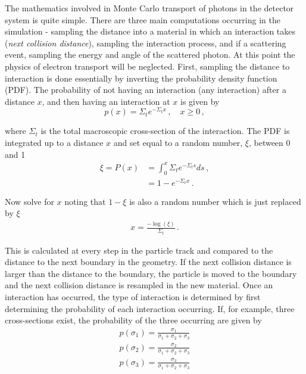 \documentclass[10pt]{article}
\begin{document}
The mathematics involved in Monte Carlo transport of photons in the detector system is quite simple. There are three main computations occurring in the simulation - sampling the distance into a material in which an interaction takes (\emph{next collision distance}), sampling the interaction process, and if a scattering event, sampling the energy and angle of the scattered photon. At this point the physics of electron transport will be neglected. First, sampling the distance to interaction is done essentially by inverting the probability density function (PDF). The probability of not having an interaction (any interaction) after a distance $x$, and then having an interaction at $x$ is given by 
%
 \begin{equation}
	p(x) = \Sigma_t e^{-\Sigma_t x}\,, \quad x \geq 0\,,
\end{equation}

\noindent where $\Sigma_t$ is the total macroscopic cross-section of the interaction. The PDF is integrated up to a distance $x$ and set equal to a random number, $\xi$, between 0 and 1
%
 \begin{align}
	\xi = P(x) &= \int_0^x \Sigma_t e^{-\Sigma_t s} ds \,, \\
	&= 1-e^{-\Sigma_t x} \,.
\end{align}

\noindent Now solve for $x$ noting that $1-\xi$ is also a random number which is just replaced by $\xi$
%
 \begin{align}
	x = \frac{-\log(\xi)}{\Sigma_t} \,.
\end{align}

\noindent This is calculated at every step in the particle track and compared to the distance to the next boundary in the geometry. If the next collision distance is larger than the distance to the boundary, the particle is moved to the boundary and the next collision distance is resampled in the new material. Once an interaction has occurred, the type of interaction is determined by first determining the probability of each interaction occurring. If, for example, three cross-sections exist, the probability of the three occurring are given by  
%
\begin{align}
	p(\sigma_1) = \frac{\sigma_1}{\sigma_1 + \sigma_2 + \sigma_3} \\
	p(\sigma_2) = \frac{\sigma_2}{\sigma_1 + \sigma_2 + \sigma_3} \\
	p(\sigma_3) = \frac{\sigma_3}{\sigma_1 + \sigma_2 + \sigma_3}
\end{align}
\end{document}
